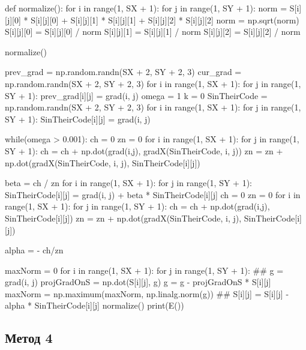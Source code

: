 \documentclass[ 12pt,x11names]{article}
\begin{document}
\begin{python}
def normalize():
    for i in range(1, SX + 1):
        for j in range(1, SY + 1):
            norm = S[i][j][0] * S[i][j][0] + S[i][j][1] * S[i][j][1] + S[i][j][2] * S[i][j][2]
            norm = np.sqrt(norm)
            S[i][j][0] = S[i][j][0] / norm
            S[i][j][1] = S[i][j][1] / norm
            S[i][j][2] = S[i][j][2] / norm

normalize()

prev_grad =  np.random.randn(SX + 2, SY + 2, 3)
cur_grad = np.random.randn(SX + 2, SY + 2, 3)
for i in range(1, SX + 1):
    for j in range(1, SY + 1):
        prev_grad[i][j] = grad(i, j)
omega = 1
k = 0
SinTheirCode = np.random.randn(SX + 2, SY + 2, 3)
for i in range(1, SX + 1):
    for j in range(1, SY + 1):
        SinTheirCode[i][j] = grad(i, j)


while(omega > 0.001):
    ch = 0
    zn = 0
    for i in range(1, SX + 1):
        for j in range(1, SY + 1):
            ch = ch + np.dot(grad(i,j), gradX(SinTheirCode, i, j))
            zn = zn + np.dot(gradX(SinTheirCode, i, j), SinTheirCode[i][j])

    beta = ch / zn
    for i in range(1, SX + 1):
        for j in range(1, SY + 1):
            SinTheirCode[i][j] = grad(i, j) + beta * SinTheirCode[i][j]
    ch = 0
    zn = 0
    for i in range(1, SX + 1):
        for j in range(1, SY + 1):
            ch = ch + np.dot(grad(i,j), SinTheirCode[i][j])
            zn = zn + np.dot(gradX(SinTheirCode, i, j), SinTheirCode[i][j])

    alpha  = - ch/zn

    maxNorm =  0
    for i in range(1, SX + 1):
        for j in range(1, SY + 1):
            ##
            g = grad(i, j)
            projGradOnS = np.dot(S[i][j], g)
            g = g - projGradOnS * S[i][j]
            maxNorm = np.maximum(maxNorm, np.linalg.norm(g))
            ##
            S[i][j] = S[i][j] - alpha * SinTheirCode[i][j]
    normalize()
print(E())

 \end{python}

\subsection{Метод 4}
\end{document}

